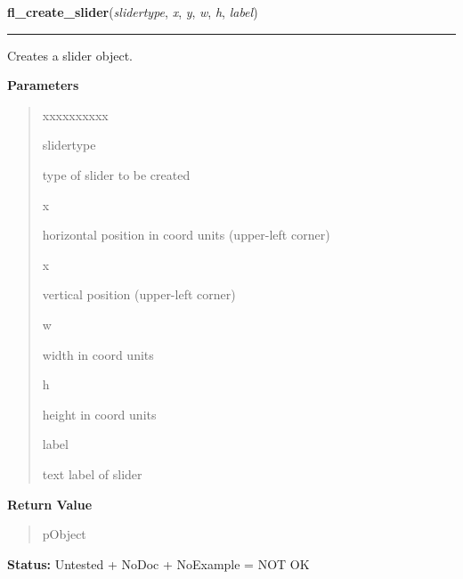     \label{xformslib:library:fl_create_slider}

    \vspace{0.5ex}

\hspace{.8\funcindent}\begin{boxedminipage}{\funcwidth}

    \raggedright \textbf{fl\_create\_slider}(\textit{slidertype}, \textit{x}, \textit{y}, \textit{w}, \textit{h}, \textit{label})

    \vspace{-1.5ex}

    \rule{\textwidth}{0.5\fboxrule}
\setlength{\parskip}{2ex}
    Creates a slider object.

\setlength{\parskip}{1ex}
      \textbf{Parameters}
      \vspace{-1ex}

      \begin{quote}
        \begin{Ventry}{xxxxxxxxxx}

          \item[slidertype]

          type of slider to be created

          \item[x]

          horizontal position in coord units (upper-left corner)

          \item[x]

          vertical position (upper-left corner)

          \item[w]

          width in coord units

          \item[h]

          height in coord units

          \item[label]

          text label of slider

        \end{Ventry}

      \end{quote}

      \textbf{Return Value}
    \vspace{-1ex}

      \begin{quote}
      pObject

      \end{quote}

\textbf{Status:} Untested + NoDoc + NoExample = NOT OK



    \end{boxedminipage}

